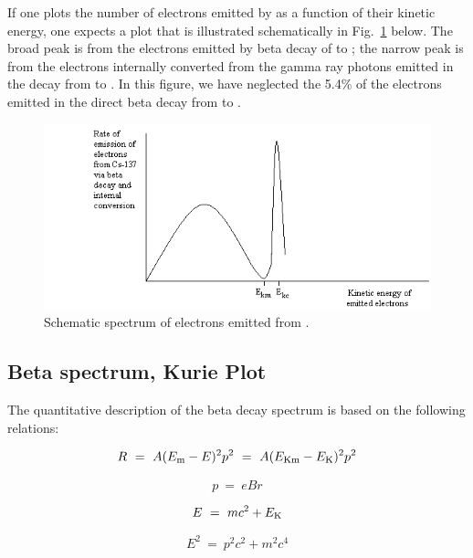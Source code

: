 If one plots the number of electrons emitted by \cs as a function of their
kinetic energy, one expects a plot that is illustrated schematically in
Fig.~\ref{fig:Espectrum} below.  The broad peak is from the electrons emitted by
beta decay of \cs to \bam; the narrow peak is from the electrons internally
converted from the gamma ray photons emitted in the decay from \bam to \ba.  In
this figure, we have neglected the 5.4\% of the electrons emitted in the direct
beta decay from \cs to \ba.
\begin{figure}
\begin{centering}
\includegraphics[width=5in]{../images/beta-img2.png} 
\caption{Schematic spectrum of electrons emitted from \cs.}
\label{fig:Espectrum}
\end{centering}
\end{figure}

\subsection{Beta spectrum, Kurie Plot}

The quantitative description of the beta decay spectrum is based on the
following relations:

\begin{equation}
R~=~A(E_{\rm m} - E)^2p^2~=~A(E_{\rm Km} - E_{\rm K})^2p^2
\label{eq:1}
\end{equation}

\begin{equation}
p~=~e B r
\label{eq:2}
\end{equation}

\begin{equation}
E~=~mc^2 + E_{\rm K}
\label{eq:3}
\end{equation}

\begin{equation}
E^2~=~p^2c^2 + m^2c^4
\label{eq:4}
\end{equation}

